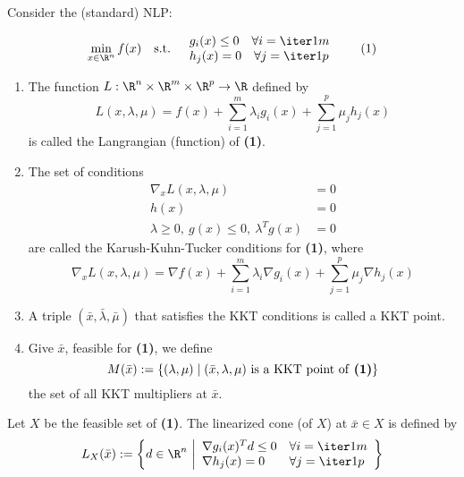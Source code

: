 \label{b38093d}

Consider the (standard) NLP:

\begin{equation*}
	\min_{x\in\R^n} f(x)\quad\text{s.t.}\quad\begin{array}{l}
		g_i(x)\leq0 \quad\forall i=\iter1m \\
		h_j(x)=0    \quad\forall j=\iter1p
	\end{array}
	\tag*{(1)}
\end{equation*}

\begin{enumerate}
	\item The function $L:\R^n\times\R^m\times\R^p\to\R$ defined by
	      $$
		      L(x,\lambda,\mu)=f(x)+\sum_{i=1}^m\lambda_ig_i(x)+\sum_{j=1}^p\mu_jh_j(x)
	      $$
	      is called the Langrangian (function) of \textbf{(1)}.
	\item The set of conditions
	      \begin{align*}
		      \nabla_xL(x,\lambda,\mu)                 & = 0 \\
		      h(x)                                     & = 0 \\
		      \lambda\geq0,\ g(x)\leq0,\ \lambda^Tg(x) & =0
	      \end{align*}
	      are called the Karush-Kuhn-Tucker conditions for \textbf{(1)},
	      where
	      $$\nabla_xL(x,\lambda,\mu)=\nabla f(x)+\sum_{i=1}^m\lambda_i\nabla g_i(x)+\sum_{j=1}^p\mu_j\nabla h_j(x)$$
	\item A triple $(\bar x,\bar\lambda,\bar\mu)$ that satisfies the
	      KKT conditions is called a KKT point.
	\item Give $\bar x$, feasible for \textbf{(1)}, we define
	      $$
		      M(\bar x):=\{(\lambda,\mu)\mid(\bar x,\lambda,\mu)\text{ is a KKT point of \textbf{(1)}} \}
	      $$
	      the set of all KKT multipliers at $\bar x$.
\end{enumerate}

\label{ca4f471}

Let $X$ be the feasible set of \textbf{(1)}. The linearized cone (of
$X$) at $\bar x\in X$ is defined by
$$
	L_X(\bar x):=\left\{ d\in\R^n\ \middle\vert
	\begin{array}{l l}
		\nabla g_i(x)^Td\leq0 & \forall i=\iter1m \\
		\nabla h_j(x)=0       & \forall j=\iter1p
	\end{array}
	\right\}
$$

